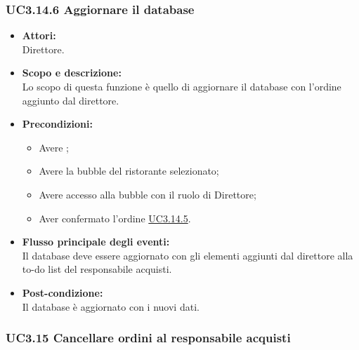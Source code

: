 \subsubsection{UC3.14.6 Aggiornare il database} \label{UC3.14.6}

\begin{itemize}
	\item \textbf{Attori:}
	\\Direttore.
	\item \textbf{Scopo e descrizione:} 
	\\Lo scopo di questa funzione è quello di aggiornare il database con l’ordine aggiunto dal direttore.
	\item \textbf{Precondizioni:}
	\begin{itemize}
		\item Avere ;
		\item Avere la bubble del ristorante selezionato;
		\item Avere accesso alla bubble con il ruolo di Direttore;
		\item Aver confermato l’ordine \hyperref[UC3.14.5]{UC3.14.5}.
	\end{itemize}
	\item \textbf{Flusso principale degli eventi:}
	\\Il database deve essere aggiornato con gli elementi aggiunti dal direttore alla to-do list del responsabile acquisti.
	\item \textbf{Post-condizione:}
	\\Il database è aggiornato con i nuovi dati.
\end{itemize}

\subsubsection{UC3.15 Cancellare ordini al responsabile acquisti} \label{UC3.15}


